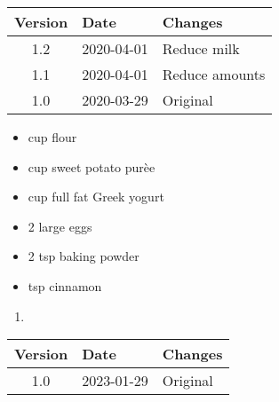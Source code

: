 \vfill

\begin{tabular}{ c | l | l }
  \textbf{Version} & \textbf{Date} & \textbf{Changes} \\ 
  \hline		
  1.2 & 2020-04-01 & Reduce milk \\
  1.1 & 2020-04-01 & Reduce amounts \\
  1.0 & 2020-03-29 & Original \\
\end{tabular}



\ingredients
\begin{multicols}{2}
\raggedcolumns %
\begin{itemize}
    \item {} cup flour
    \item {} cup sweet potato purèe
    \item {} cup full fat Greek yogurt
    \item 2 large eggs
    \item 2 tsp baking powder
    \item {} tsp cinnamon
\end{itemize}
\end{multicols}

\instructions
\begin{enumerate}
    \item 
\end{enumerate}

\vfill

\begin{tabular}{ c | l | l }
  \textbf{Version} & \textbf{Date} & \textbf{Changes} \\ 
  \hline		
  1.0 & 2023-01-29 & Original \\
\end{tabular}